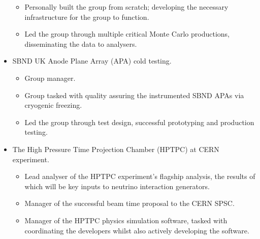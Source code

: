 \documentclass[margin,line]{res}
\begin{document}
\begin{resume}
\begin{itemize}
\begin{itemize}
\item Personally built the group from scratch; developing the necessary infrastructure for the group to function.
\item Led the group through multiple critical Monte Carlo productions, disseminating the data to analysers.
\end{itemize}
\item SBND UK Anode Plane Array (APA) cold testing.
\begin{itemize}
\item Group manager.
\item Group tasked with quality assuring the instrumented SBND APAs via cryogenic freezing.
\item Led the group through test design, successful prototyping and production testing.
\end{itemize}
\item The High Pressure Time Projection Chamber (HPTPC) at CERN experiment.
\begin{itemize}
\item Lead analyser of the HPTPC experiment's flagship analysis, the results of which will be key inputs to neutrino interaction generators.
\item Manager of the successful beam time proposal to the CERN SPSC. 
\item Manager of the HPTPC physics simulation software, tasked with coordinating the developers whilst also actively developing the software.
\end{itemize}
\end{itemize}






\end{resume}
\end{document}
